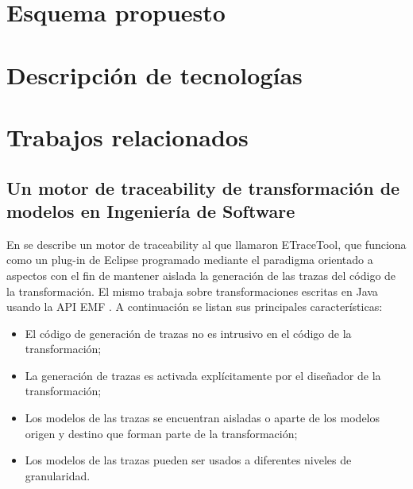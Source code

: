 \documentclass[a4paper,12pt,oneside]{book}
\begin{document}
\chapter{Esquema propuesto}\label{cap:Propuesta}


\chapter{Descripción de tecnologías}


\chapter{Trabajos relacionados}

\section{Un motor de traceability de transformación de modelos en Ingeniería de Software}

En \cite{AmarLeblancCoulette} se describe un motor de traceability al que llamaron ETraceTool, que funciona como un plug-in de Eclipse programado mediante el paradigma orientado a aspectos con el fin de mantener aislada la generación de las trazas del código de la transformación. El mismo trabaja sobre transformaciones escritas en Java usando la API EMF \cite{EMF}. A continuación se listan sus principales características:

\begin{itemize}
\item     El código de generación de trazas no es intrusivo en el código de la transformación;
\item    La generación de trazas es activada explícitamente por el diseñador de la transformación;
\item    Los modelos de las trazas se encuentran aisladas o aparte de los modelos origen y destino que forman parte de la transformación;
\item    Los modelos de las trazas pueden ser usados a diferentes niveles de granularidad.
\end{itemize}
\end{document}
